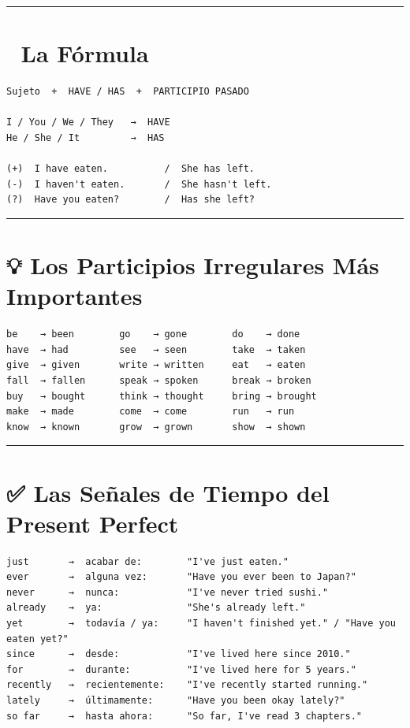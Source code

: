 \documentclass[
  spanish,
  letterpaper,
]{scrbook}
\begin{document}
\begin{center}\rule{0.5\linewidth}{0.5pt}\end{center}

\section{📐 La Fórmula}\label{la-fuxf3rmula-3}

\begin{verbatim}
Sujeto  +  HAVE / HAS  +  PARTICIPIO PASADO

I / You / We / They   →  HAVE
He / She / It         →  HAS

(+)  I have eaten.          /  She has left.
(-)  I haven't eaten.       /  She hasn't left.
(?)  Have you eaten?        /  Has she left?
\end{verbatim}

\begin{center}\rule{0.5\linewidth}{0.5pt}\end{center}

\section{💡 Los Participios Irregulares Más
Importantes}\label{los-participios-irregulares-muxe1s-importantes}

\begin{verbatim}
be    → been        go    → gone        do    → done
have  → had         see   → seen        take  → taken
give  → given       write → written     eat   → eaten
fall  → fallen      speak → spoken      break → broken
buy   → bought      think → thought     bring → brought
make  → made        come  → come        run   → run
know  → known       grow  → grown       show  → shown
\end{verbatim}

\begin{center}\rule{0.5\linewidth}{0.5pt}\end{center}

\section{✅ Las Señales de Tiempo del Present
Perfect}\label{las-seuxf1ales-de-tiempo-del-present-perfect}

\begin{verbatim}
just       →  acabar de:        "I've just eaten."
ever       →  alguna vez:       "Have you ever been to Japan?"
never      →  nunca:            "I've never tried sushi."
already    →  ya:               "She's already left."
yet        →  todavía / ya:     "I haven't finished yet." / "Have you eaten yet?"
since      →  desde:            "I've lived here since 2010."
for        →  durante:          "I've lived here for 5 years."
recently   →  recientemente:    "I've recently started running."
lately     →  últimamente:      "Have you been okay lately?"
so far     →  hasta ahora:      "So far, I've read 3 chapters."
\end{verbatim}
\end{document}
